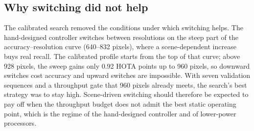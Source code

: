 \subsection{Why switching did not help}
The calibrated search removed the conditions under which switching helps. The hand-designed controller switches between resolutions on the steep part of the accuracy--resolution curve (640--832 pixels), where a scene-dependent increase buys real recall. The calibrated profile starts from the top of that curve; above 928 pixels, the sweep gains only 0.92 HOTA points up to 960 pixels, so downward switches cost accuracy and upward switches are impossible. With seven validation sequences and a throughput gate that 960 pixels already meets, the search's best strategy was to stay high. Scene-driven switching should therefore be expected to pay off when the throughput budget does not admit the best static operating point, which is the regime of the hand-designed controller and of lower-power processors.

